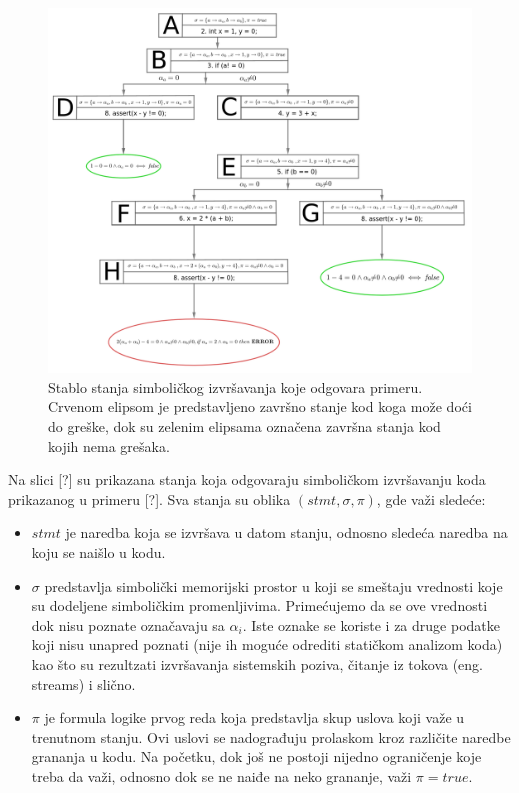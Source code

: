 \documentclass[12pt]{article}
\begin{document}
\begin{figure}[ht]
    \centering
    \includegraphics[width=1.0\linewidth]{osnovni_primer.png}
    \caption{Stablo stanja simboličkog izvršavanja koje odgovara primeru. Crvenom elipsom je predstavljeno završno stanje kod koga može doći do greške, dok su zelenim elipsama označena završna stanja kod kojih nema grešaka.}
    \label{fig:osnovni_primer}
\end{figure}

Na slici [?] su prikazana stanja koja odgovaraju simboličkom izvršavanju koda prikazanog u primeru [?]. Sva stanja su oblika $(stmt, \sigma, \pi)$, gde važi sledeće:

\begin{itemize}
    \item $stmt$ je naredba koja se izvršava u datom stanju, odnosno sledeća naredba na koju se naišlo u kodu.
    
    \item $\sigma$ predstavlja simbolički memorijski prostor u koji se smeštaju vrednosti koje su dodeljene simboličkim promenljivima. Primećujemo da se ove vrednosti dok nisu poznate označavaju sa $\alpha_i$. Iste oznake se koriste i za druge podatke koji nisu unapred poznati (nije ih moguće odrediti statičkom analizom koda) kao što su rezultzati izvršavanja sistemskih poziva, čitanje iz tokova (eng. streams) i slično.
    
    \item $\pi$ je formula logike prvog reda koja predstavlja skup uslova koji važe u trenutnom stanju. Ovi uslovi se nadograđuju prolaskom kroz različite naredbe grananja u kodu. Na početku, dok još ne postoji nijedno ograničenje koje treba da važi, odnosno dok se ne naiđe na neko grananje, važi $\pi = true$. 
\end{itemize}
\end{document}
